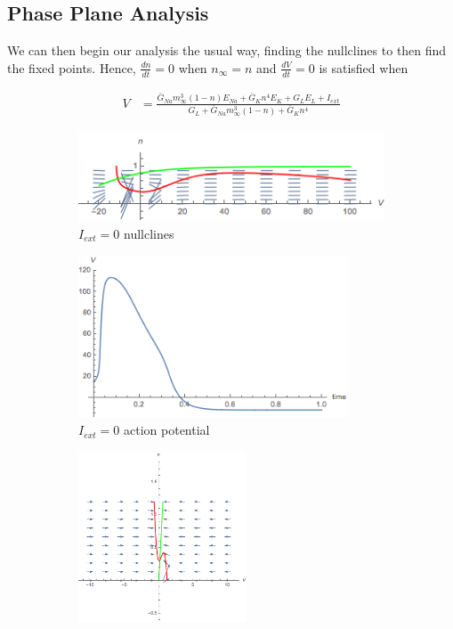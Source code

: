 \documentclass{article}
\begin{document}
\subsection{Phase Plane Analysis}

We can then begin our analysis the usual way, finding the nullclines to then find the fixed points. Hence, $\frac{dn}{dt}=0$ when $n_{\infty}=n$ and $\frac{dV}{dt}=0$ is satisfied when

\begin{align*}
        V &= \frac{\bar{G}_{Na}m_\infty^3(1-n)E_{Na}+\bar{G}_Kn^4E_K + G_LE_L + I_{ext}}{G_L + \bar{G}_{Na}m_\infty^3(1-n)+ \bar{G}_Kn^4}
\end{align*}

\begin{figure}
\centering
\begin{subfigure}{\textwidth}
	\centering
	\includegraphics[width=10cm]{fast_slow_nullclines.png}
	\caption{$I_{ext}=0$ nullclines}
\end{subfigure}
\begin{subfigure}{\textwidth}
	\centering
	\includegraphics[width=8cm]{zero_ext_actionpotential.png}
	\caption{$I_{ext}=0$ action potential}
\end{subfigure}
\begin{subfigure}{\textwidth}
	\centering
	\includegraphics[width=5cm]{fast_slow_nullc_imp}

\end{subfigure}
\end{figure}
\end{document}
